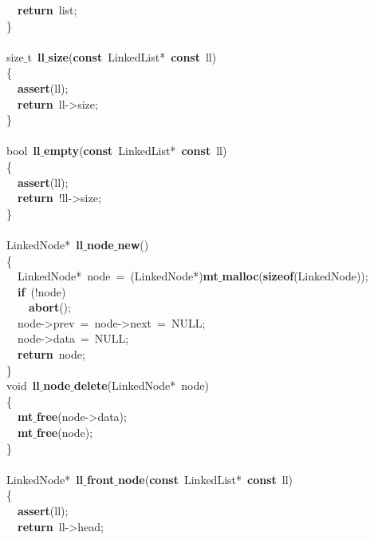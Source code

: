 \documentclass{article}
\begin{document}
\mbox{}\ \ \textbf{return}\ list; \\
\mbox{}\} \\
\mbox{} \\
\mbox{}size$\_$t\ \textbf{ll$\_$size}(\textbf{const}\ LinkedList*\ \textbf{const}\ ll) \\
\mbox{}\{ \\
\mbox{}\ \ \textbf{assert}(ll); \\
\mbox{}\ \ \textbf{return}\ ll-\textgreater{}size; \\
\mbox{}\} \\
\mbox{} \\
\mbox{}bool\ \textbf{ll$\_$empty}(\textbf{const}\ LinkedList*\ \textbf{const}\ ll) \\
\mbox{}\{ \\
\mbox{}\ \ \textbf{assert}(ll); \\
\mbox{}\ \ \textbf{return}\ !ll-\textgreater{}size; \\
\mbox{}\} \\
\mbox{} \\
\mbox{}LinkedNode*\ \textbf{ll$\_$node$\_$new}() \\
\mbox{}\{ \\
\mbox{}\ \ LinkedNode*\ node\ =\ (LinkedNode*)\textbf{mt$\_$malloc}(\textbf{sizeof}(LinkedNode)); \\
\mbox{}\ \ \textbf{if}\ (!node) \\
\mbox{}\ \ \ \ \textbf{abort}(); \\
\mbox{}\ \ node-\textgreater{}prev\ =\ node-\textgreater{}next\ =\ NULL; \\
\mbox{}\ \ node-\textgreater{}data\ =\ NULL; \\
\mbox{}\ \ \textbf{return}\ node; \\
\mbox{}\} \\
\mbox{}void\ \textbf{ll$\_$node$\_$delete}(LinkedNode*\ node) \\
\mbox{}\{ \\
\mbox{}\ \ \textbf{mt$\_$free}(node-\textgreater{}data); \\
\mbox{}\ \ \textbf{mt$\_$free}(node); \\
\mbox{}\} \\
\mbox{} \\
\mbox{}LinkedNode*\ \textbf{ll$\_$front$\_$node}(\textbf{const}\ LinkedList*\ \textbf{const}\ ll) \\
\mbox{}\{ \\
\mbox{}\ \ \textbf{assert}(ll); \\
\mbox{}\ \ \textbf{return}\ ll-\textgreater{}head; \\
\end{document}
